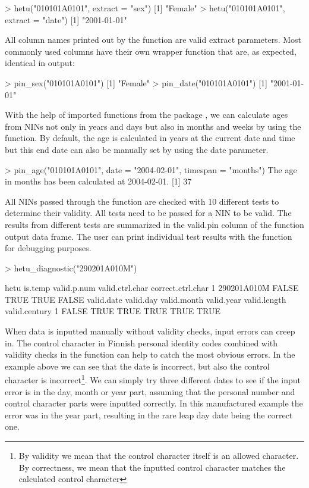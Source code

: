 \begin{example}
  > hetu("010101A0101", extract = "sex")
  [1] "Female"
  > hetu("010101A0101", extract = "date")
  [1] "2001-01-01"
\end{example}

All column names printed out by the  function are valid extract parameters. Most commonly used columns have their own wrapper function that are, as expected, identical in output:

\begin{example}
  > pin_sex("010101A0101")
  [1] "Female"
  > pin_date("010101A0101")
  [1] "2001-01-01"
\end{example}

With the help of imported functions from the  package \citep{lubridate}, we can calculate ages from NINs not only in years and days but also in months and weeks by using the  function. By default, the age is calculated in years at the current date and time but this end date can also be manually set by using the date parameter.

\begin{example}
  > pin_age("010101A0101", date = "2004-02-01", timespan = "months")
  The age in months has been calculated at 2004-02-01.
  [1] 37
\end{example}

All NINs passed through the  function are checked with 10 different tests to determine their validity. All tests need to be passed for a NIN to be valid. The results from different tests are summarized in the valid.pin column of the  function output data frame. The user can print individual test results with the  function for debugging purposes.

\begin{example}
  > hetu_diagnostic("290201A010M")
  
           hetu is.temp valid.p.num valid.ctrl.char correct.ctrl.char
  1 290201A010M   FALSE        TRUE            TRUE             FALSE
    valid.date valid.day valid.month valid.year valid.length valid.century
  1      FALSE      TRUE        TRUE       TRUE         TRUE          TRUE
\end{example}

When data is inputted manually without validity checks, input errors can creep in. The control character in Finnish personal identity codes combined with validity checks in the  function can help to catch the most obvious errors. In the example above we can see that the date is incorrect, but also the control character is incorrect\footnote{By validity we mean that the control character itself is an allowed character. By correctness, we mean that the inputted control character matches the calculated control character}. We can simply try three different dates to see if the input error is in the day, month or year part, assuming that the personal number and control character parts were inputted correctly. In this manufactured example the error was in the year part, resulting in the rare leap day date being the correct one.

